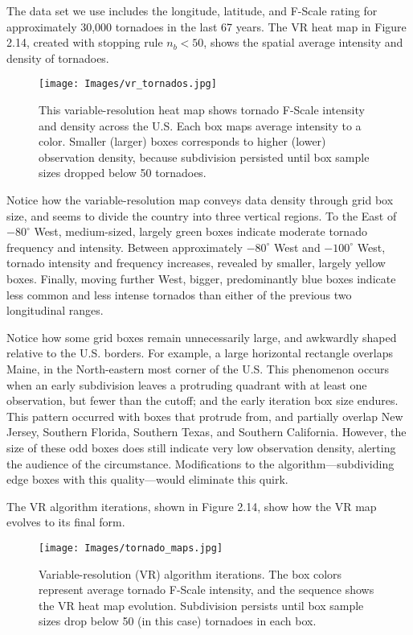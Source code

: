 The data set we use includes the longitude, latitude, and F-Scale rating for approximately 30,000 tornadoes in the last 67 years. The VR heat map in Figure 2.14, created with stopping rule $n_{b} < 50$, shows the spatial average intensity and density of tornadoes.
        \begin{figure}[H]
      	\centering      
      	\texttt{[image: Images/vr\_tornados.jpg]}
      	\caption{This variable-resolution heat map shows tornado F-Scale intensity and density across the U.S. Each box maps average intensity to a color. Smaller (larger) boxes corresponds to higher (lower) observation density, because subdivision persisted until box sample sizes dropped below 50 tornadoes.}
        \end{figure}
Notice how the variable-resolution map conveys data density through grid box size, and seems to divide the country into three vertical regions. To the East of $-80^{\circ}$ West, medium-sized, largely green boxes indicate moderate tornado frequency and intensity. Between approximately $-80^{\circ}$ West and $-100^{\circ}$ West, tornado intensity and frequency increases, revealed by smaller, largely yellow boxes. Finally, moving further West, bigger, predominantly blue boxes indicate less common and less intense tornados than either of the previous two longitudinal ranges.

Notice how some grid boxes remain unnecessarily large, and awkwardly shaped relative to the U.S. borders. For example, a large horizontal rectangle overlaps Maine, in the North-eastern most corner of the U.S. This phenomenon occurs when an early subdivision leaves a protruding quadrant with at least one observation, but fewer than the cutoff; and the early iteration box size endures. This pattern occurred with boxes that protrude from, and partially overlap New Jersey, Southern Florida, Southern Texas, and Southern California. However, the size of these odd boxes does still indicate very low observation density, alerting the audience of the circumstance. Modifications to the algorithm---subdividing edge boxes with this quality---would eliminate this quirk.

The VR algorithm iterations, shown in Figure 2.14, show how the VR map evolves to its final form.
        \begin{figure}[H]
      	\centering      
      	\texttt{[image: Images/tornado\_maps.jpg]}
      	\caption{Variable-resolution (VR) algorithm iterations. The box colors represent average tornado F-Scale intensity, and the sequence shows the VR heat map evolution. Subdivision persists until box sample sizes drop below 50 (in this case) tornadoes in each box.}
        \end{figure}